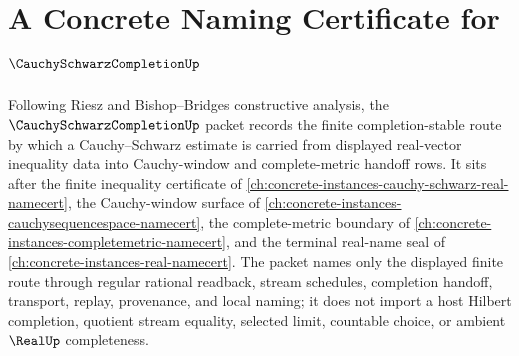 \chapter{A Concrete Naming Certificate for $\CauchySchwarzCompletionUp$}
\label{ch:concrete-instances-cauchy-schwarz-completion-namecert}

Following Riesz and Bishop--Bridges constructive analysis, the $\CauchySchwarzCompletionUp$ packet records the finite completion-stable route by which a Cauchy--Schwarz estimate is carried from displayed real-vector inequality data into Cauchy-window and complete-metric handoff rows. It sits after the finite inequality certificate of \autoref{ch:concrete-instances-cauchy-schwarz-real-namecert}, the Cauchy-window surface of \autoref{ch:concrete-instances-cauchysequencespace-namecert}, the complete-metric boundary of \autoref{ch:concrete-instances-completemetric-namecert}, and the terminal real-name seal of \autoref{ch:concrete-instances-real-namecert}. The packet names only the displayed finite route through regular rational readback, stream schedules, completion handoff, transport, replay, provenance, and local naming; it does not import a host Hilbert completion, quotient stream equality, selected limit, countable choice, or ambient $\RealUp$ completeness.

